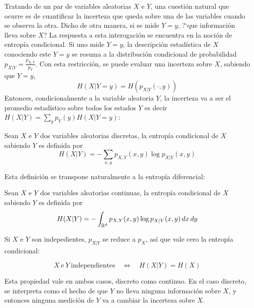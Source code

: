 \label{s:SZ:Mutua}

Tratando de un par de variables aleatorias $X$ e $Y$, una cuesti\'on natural que
ocurre  es de  cuantificar la  incerteza que  queda sobre  una de  las variables
cuando se  observa la otra.   Dicho de otra  manera, si se  mide $Y =  y$, ?`que
informaci\'on lleva sobre  $X$? La respuesta a esta  interogaci\'on se encuentra
en la noci\'on de entrop\'ia condicional.  Si uno mide $Y = y$, la descripci\'on
estad\'istica  de $X$  conociendo este  $Y =  y$ se  resuma a  la distribuci\'on
condicional   de  probabilidad  $p_{X|Y}   =  \frac{p_{X,Y}}{p_Y}$.    Con  esta
restricci\'on, se puede evaluar una incerteza sobre $X$, sabiendo que $Y=y$,
%
\[
H(X|Y=y) = H\left( p_{X|Y}(\cdot,y) \right)
\]
%
Entonces, condicionalmente a la variable aleatoria $Y$, la incerteza va a ser el
promedio estad\'istico  sobre todos  los estados $Y$  es decir $H(X|Y)  = \sum_y
p_Y(y) H(X|Y=y)$:
%
\begin{definicion}\label{def:SZ:entropiacondicional}
  Sean $X$ e  $Y$ dos variables aleatorias discretas,  la entrop\'ia condicional
  de $X$ sabiendo $Y$ es definida por
  \[
  H(X|Y) = - \sum_{x,y} p_{X,Y}(x,y) \log p_{X|Y}(x,y)
  \]
\end{definicion}
%
Esta definici\'on se transpone naturalmente a la entrop\'ia diferencial:
%
\begin{definicion}\label{def:SZ:entropiadiferencialcondicional}
  Sean $X$ e  $Y$ dos variables aleatorias continuas,  la entrop\'ia condicional
  de $X$ sabiendo $Y$ es definida por
  \[
  H(X|Y) = - \int_{\mathbb{R}^d} p_{X,Y}(x,y) \log p_{X|Y}(x,y) \, dx \, dy
  \]
\end{definicion}

Si $X$ e $Y$ son indepedientes, $p_{X|Y}$ se reduce a $p_X$, as\'i que vale cero
la entrop\'ia condicional:
%
\begin{propiedades}
\item\label{prop:SZ:independenciacondicional}
  \[
  X \: \mbox{e} \: Y \: \mbox{independientes} \quad \Leftrightarrow \quad H(X|Y)
  = H(X)
  \]
\end{propiedades}
%
Esta  propiedad  vale  en ambos  casos,  discreto  como  continuo.  En  el  caso
discreto, se interpreta como el hecho  de que $Y$ no lleva ninguna informaci\'on
sobre $X$, y entonces ninguna medici\'on  de $Y$ va a cambiar la incerteza sobre
$X$.

